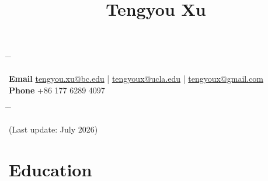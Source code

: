 \documentclass[10pt]{article} %
\begin{document}

\title{Tengyou Xu}%


\parbox{1.2\textwidth}{ %
\begin{tabbing} %
\hspace{2cm} \= \hspace{1cm} \= \kill %

{\bf Email} \> \href{mailto:tengyou.xu@bc.edu}{tengyou.xu@bc.edu} | \href{mailto:tengyoux@ucla.edu}{tengyoux@ucla.edu} | \href{mailto:tengyoux@gmail.com}{tengyoux@gmail.com}\\ %
{\bf Phone} \> +86 177 6289 4097 \\ %

\end{tabbing}}
\hfill %
\parbox{0.5\textwidth}{ %
\begin{tabbing} %
\hspace{2cm} \= \hspace{1cm} \= \kill %
\end{tabbing}}

(Last update: July 2026)


\section{Education}

\end{document}

